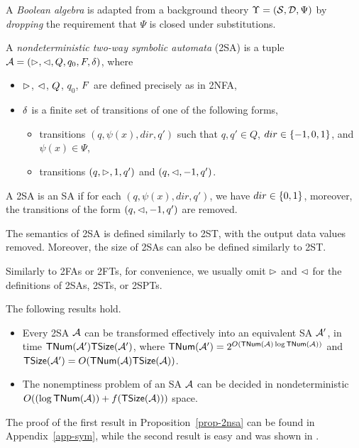 A \emph{Boolean algebra} is adapted from a background theory $\Upsilon=(\mathcal{S},\mathcal{D}, \Psi)$ by \emph{dropping} the requirement that $\Psi$ is closed under substitutions.

\begin{definition}
    A \emph{nondeterministic two-way  symbolic \emph{automata}} (2SA) is a tuple $\mathcal{A} = (\vartriangleright, \vartriangleleft, Q, q_0, F, \delta)$, where  
\begin{itemize}
%
\item $\vartriangleright$, $\vartriangleleft$, $Q$, $q_0$, $F$ are defined precisely as in 2NFA, 
%
\item $\delta$ is a finite set of  transitions of one of the following forms,
\begin{itemize}
\item   transitions $(q, \psi(x), dir, q')$ such that $q, q' \in Q$, $dir \in \{-1, 0, 1\}$, and $\psi(x) \in \Psi$, 
%
\item   transitions $(q, \vartriangleright, 1, q')$ and $(q, \vartriangleleft, -1, q')$. 
\end{itemize}
\end{itemize}
A 2SA is an SA if for each $(q, \psi(x), dir, q')$, we have $dir \in \{0, 1\}$, moreover, the transitions of the form $(q, \vartriangleleft, -1, q')$ are removed.
\end{definition}
The semantics of 2SA  is defined similarly to 2ST, with the output data values removed. Moreover, the size of 2SAs can also be defined similarly to 2ST.

Similarly to 2FAs or 2FTs, for convenience, we usually omit $\vartriangleright$ and $\vartriangleleft$ for the definitions of 2SAs, 2STs, or 2SPTs.

\begin{proposition}\label{prop-2nsa}
The following results hold.
\begin{itemize}
\item Every 2SA $\mathcal{A}$ can be transformed effectively into an equivalent SA $\mathcal{A}'$, in time $\mathsf{TNum}(\mathcal{A}') \mathsf{TSize}(\mathcal{A}')$, where $\mathsf{TNum}(\mathcal{A}') = 2^{O\left(\mathsf{TNum}(\mathcal{A}) \log \mathsf{TNum}(\mathcal{A})\right)}$ and $\mathsf{TSize}(\mathcal{A}') = O( \mathsf{TNum}(\mathcal{A}) \mathsf{TSize}(\mathcal{A}))$.
%
%
%
\item The nonemptiness problem of an SA $\mathcal{A}$ can be decided in nondeterministic $O( (\log \mathsf{TNum}(\mathcal{A})) + f(\mathsf{TSize}(\mathcal{A})))$ space.
\end{itemize}
\end{proposition}
The proof of the first result in Proposition~\ref{prop-2nsa} can be found in Appendix~\ref{app-sym}, while the second result is easy and was shown in \cite{NG01,DV14}.

